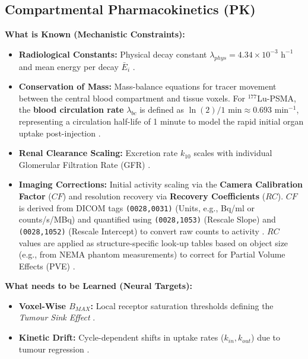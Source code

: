 \documentclass[11pt,a4paper]{article}
\begin{document}
\subsection{Compartmental Pharmacokinetics (PK)}
\textbf{What is Known (Mechanistic Constraints):}
\begin{itemize}
    \item \textbf{Radiological Constants:} Physical decay constant $\lambda_{phys} = 4.34 \times 10^{-3} \text{ h}^{-1}$ and mean energy per decay $\bar{E}_i$ \cite{ReschFouladgar2023, StabinMadsen2019}.
    \item \textbf{Conservation of Mass:} Mass-balance equations for tracer movement between the central blood compartment and tissue voxels. For $^{177}$Lu-PSMA, the \textbf{blood circulation rate} $\lambda_{bc}$ is defined as $\ln(2)/1 \text{ min} \approx 0.693 \text{ min}^{-1}$, representing a circulation half-life of 1 minute to model the rapid initial organ uptake post-injection \cite{HardiansyahYousefzadehNowshahr2024}.
    \item \textbf{Renal Clearance Scaling:} Excretion rate $k_{10}$ scales with individual Glomerular Filtration Rate (GFR) \cite{HardiansyahYousefzadehNowshahr2024}.
    \item \textbf{Imaging Corrections:} Initial activity scaling via the \textbf{Camera Calibration Factor} ($CF$) and resolution recovery via \textbf{Recovery Coefficients} ($RC$). $CF$ is derived from DICOM tags \texttt{(0028,0031)} (Units, e.g., Bq/ml or counts/s/MBq) and quantified using \texttt{(0028,1053)} (Rescale Slope) and \texttt{(0028,1052)} (Rescale Intercept) to convert raw counts to activity \cite{GleisnerChouin2022}. $RC$ values are applied as structure-specific look-up tables based on object size (e.g., from NEMA phantom measurements) to correct for Partial Volume Effects (PVE) \cite{KlettingSchimmel2015}.
\end{itemize}

\textbf{What needs to be Learned (Neural Targets):}
\begin{itemize}
    \item \textbf{Voxel-Wise $B_{MAX}$:} Local receptor saturation thresholds defining the \textit{Tumour Sink Effect} \cite{BegumThieme2018}.
    \item \textbf{Kinetic Drift:} Cycle-dependent shifts in uptake rates ($k_{in}, k_{out}$) due to tumour regression \cite{OkamotoThieme2016, SiebingaVeen2024}.
\end{itemize}
\end{document}

